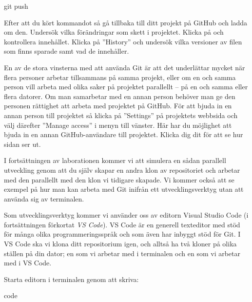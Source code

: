 \begin{Datorarbete}
	\begin{Code}
		git push
	\end{Code}

	Efter att du kört kommandot så gå tillbaka till ditt projekt på GitHub och ladda om den. Undersök vilka förändringar som skett i projektet. Klicka på  och kontrollera innehållet. Klicka på ''History'' och undersök vilka versioner av filen som finns sparade samt vad de innehåller.

	\item En av de stora vinsterna med att använda Git är att det underlättar mycket när flera personer arbetar tillsammans på samma projekt, eller om en och samma person vill arbeta med olika saker på projektet parallellt -- på en och samma eller flera datorer. Om man samarbetar med en annan person behöver man ge den personen rättighet att arbeta med projektet på GitHub. För att bjuda in en annan person till projektet så klicka på ''Settings'' på projektets webbsida och välj därefter ''Manage access'' i menyn till vänster. Här har du möjlighet att bjuda in en annan GitHub-användare till projektet. Klicka dig dit för att se hur sidan ser ut.

	I fortsättningen av laborationen kommer vi att simulera en sådan parallell utveckling genom att du själv skapar en andra klon av repositoriet och arbetar med den parallellt med den klon vi tidigare skapade. Vi kommer också att se exempel på hur man kan arbeta med Git inifrån ett utvecklingsverktyg utan att använda sig av terminalen.


	Som utvecklingsverktyg kommer vi använder oss av editorn Visual Studio Code (i fortsättningen förkortat \emph{VS Code}). VS Code är en generell texteditor med stöd för många olika programmeringsspråk och som även har inbyggt stöd för Git. I VS Code ska vi klona ditt repositorium igen, och alltså ha två kloner på olika ställen på din dator; en som vi arbetar med i terminalen och en som vi arbetar med i VS Code.

	Starta editorn i terminalen genom att skriva:

	\begin{Code}
		code
	\end{Code}


\end{Datorarbete}
